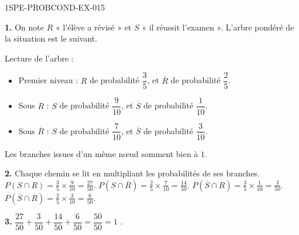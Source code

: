 \begin{corrige}{1SPE-PROBCOND-EX-015}

\textbf{1.} On note $R$ « l'élève a révisé » et $S$ « il réussit l'examen ». L'arbre pondéré de la situation est le suivant.

\begin{nxarbreproba}
\end{nxarbreproba}

Lecture de l'arbre :

\begin{itemize}
  \item Premier niveau : $R$ de probabilité $\dfrac{3}{5}$, et $\overline{R}$ de probabilité $\dfrac{2}{5}$.
  \item Sous $R$ : $S$ de probabilité $\dfrac{9}{10}$, et $\overline{S}$ de probabilité $\dfrac{1}{10}$.
  \item Sous $\overline{R}$ : $S$ de probabilité $\dfrac{7}{10}$, et $\overline{S}$ de probabilité $\dfrac{3}{10}$.
\end{itemize}

Les branches issues d'un même nœud somment bien à $1$.

\medskip

\textbf{2.} Chaque chemin se lit en multipliant les probabilités de ses branches. $P(S \cap R) = \frac{3}{5} \times \frac{9}{10} = \frac{27}{50}$. $P(S \cap \overline{R}) = \frac{2}{5} \times \frac{7}{10} = \frac{14}{50}$. $P(\overline{S} \cap R) = \frac{3}{5} \times \frac{1}{10} = \frac{3}{50}$. $P(\overline{S} \cap \overline{R}) = \frac{2}{5} \times \frac{3}{10} = \frac{6}{50}$.

\medskip
\textbf{3.} $\dfrac{27}{50} + \dfrac{3}{50} + \dfrac{14}{50} + \dfrac{6}{50} = \dfrac{50}{50} = 1$ \checkmark.

\end{corrige}
